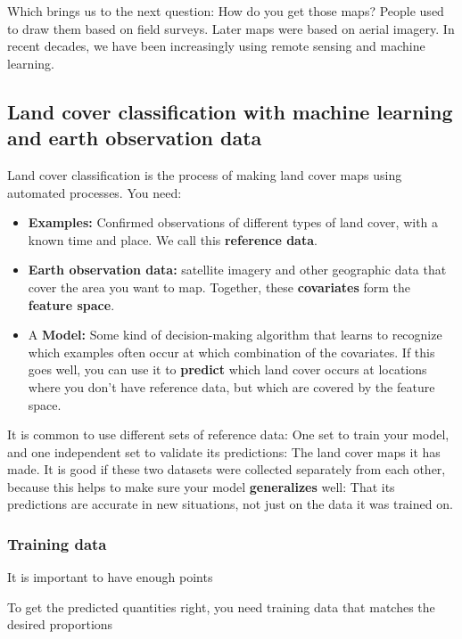     Which brings us to the next question: How do you get those maps? People used to draw them based on field surveys. Later maps were based on aerial imagery. In recent decades, we have been increasingly using remote sensing and machine learning.

\subsection*{Land cover classification with machine learning and earth observation data}
    
    Land cover classification is the process of making land cover maps using automated processes. You need:
    
    \begin{itemize}
        \item \textbf{Examples:} Confirmed observations of different types of land cover, with a known time and place. We call this \textbf{reference data}.
        \item \textbf{Earth observation data:} satellite imagery and other geographic data that cover the area you want to map. Together, these \textbf{covariates} form the \textbf{feature space}.
        \item A \textbf{Model:} Some kind of decision-making algorithm that learns to recognize which examples often occur at which combination of the covariates. If this goes well, you can use it to \textbf{predict} which land cover occurs at locations where you don't have reference data, but which are covered by the feature space.
    \end{itemize}
    
    It is common to use different sets of reference data: One set to train your model, and one independent set to validate its predictions: The land cover maps it has made. It is good if these two datasets were collected separately from each other, because this helps to make sure your model \textbf{generalizes} well: That its predictions are accurate in new situations, not just on the data it was trained on.

    \subsubsection*{Training data}

        It is important to have enough points \citep{ramezan2021effects,rodriguez-perez2017influence,zhu2016optimizing}
        
        To get the predicted quantities right, you need training data that matches the desired proportions \citep{}
        
